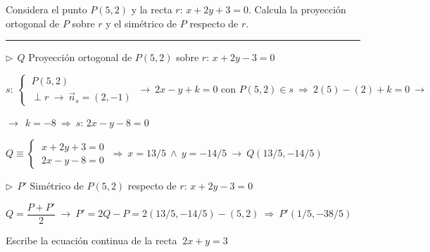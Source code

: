 \begin{miejercicio}

Considera el punto $P(5,2)$ y la recta $r:\, x+2y+3=0$. Calcula la proyección ortogonal de $P$ sobre $r$ y el simétrico de $P$ respecto de $r$.

\rule{250pt}{0.1pt}

\vspace{2mm} $\triangleright \ \ Q$ Proyección ortogonal de $P(5,2)$ sobre $r:\, x+2y-3=0$

\vspace{2mm} $s:\, \begin{cases} \ P(5,2) \\ \ \perp r \ \to \ \vec n_s=(2,-1) \end{cases} \ \to \ 2x-y+k=0 \text{ con } P(5,2)\in s \ \Rightarrow \ 2(5)-(2)+k=0 \ \to $

\vspace{3mm} $\to \ \ k=-8 \ \Rightarrow \ s:\, 2x-y-8=0$

\vspace{2mm} $Q\equiv \begin{cases} \ x+2y+3=0 \\ \ 2x-y-8=0 \end{cases}\ \Rightarrow \  x=13/5 \ \wedge \ y=-14/5 \ \longrightarrow \  Q(13/5,-14/5)$

\vspace{5mm} $\triangleright \ \ P'$ Simétrico de $P(5,2)$ respecto de  $r:\, x+2y-3=0$

\vspace{2mm} $Q=\dfrac{P+P'}{2} \ \to \ P'=2Q-P=2(13/5,-14/5)-(5,2) \ \Rightarrow \  P'(1/5,-38/5)$

\end{miejercicio}

\vspace{10mm}
\begin{mipropuesto}

Escribe la ecuación continua de la recta $\ 2x+y=3$

\end{mipropuesto}

